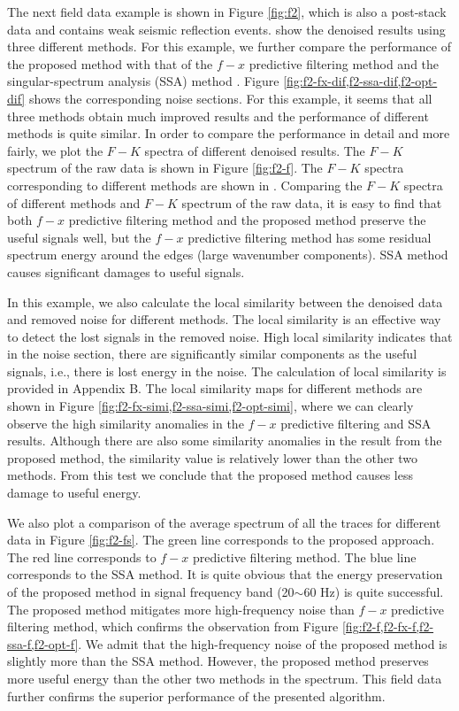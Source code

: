 The next field data example is shown in Figure \ref{fig:f2}, which is also a post-stack data and contains weak seismic reflection events.   show the denoised results using three different methods. For this example, we further compare the performance of the proposed method with that of the $f-x$ predictive filtering method and the singular-spectrum analysis (SSA) method \cite[]{vautard1992singular}. Figure \ref{fig:f2-fx-dif,f2-ssa-dif,f2-opt-dif} shows the corresponding noise sections. For this example, it seems that all three methods obtain much improved results and the performance of different methods is quite similar. In order to compare the performance in detail and more fairly, we plot the $F-K$ spectra of different denoised results. The $F-K$ spectrum of the raw data is shown in Figure \ref{fig:f2-f}. The $F-K$ spectra corresponding to different methods are shown in . Comparing the $F-K$ spectra of different methods and $F-K$ spectrum of the raw data, it is easy to find that both $f-x$ predictive filtering method and the proposed method preserve the useful signals well, but the $f-x$ predictive filtering method has some residual spectrum energy around the edges (large wavenumber components). SSA method causes significant damages to useful signals.

In this example, we also calculate the local similarity between the denoised data and removed noise for different methods. The local similarity is an effective way to detect the lost signals in the removed noise. High local similarity indicates that in the noise section, there are significantly similar components as the useful signals, i.e., there is lost energy in the noise. The calculation of local similarity is provided in Appendix B. The local similarity maps for different methods are shown in Figure \ref{fig:f2-fx-simi,f2-ssa-simi,f2-opt-simi}, where we can clearly observe the high similarity anomalies in the $f-x$ predictive filtering and SSA results. Although there are also some similarity anomalies in the result from the proposed method, the similarity value is relatively lower than the other two methods. From this test we conclude that the proposed method causes less damage to useful energy.

We also plot a comparison of the average spectrum of all the traces for different data in Figure \ref{fig:f2-fs}. The green line corresponds to the proposed approach. The red line corresponds to $f-x$ predictive filtering method.  The blue line corresponds to the SSA method. It is quite obvious that the energy preservation of the proposed method in signal frequency band (20$\sim$60 Hz) is quite successful. The proposed method mitigates more high-frequency noise than $f-x$ predictive filtering method, which confirms the observation from Figure \ref{fig:f2-f,f2-fx-f,f2-ssa-f,f2-opt-f}. We admit that the high-frequency noise of the proposed method is slightly more than the SSA method. However, the proposed method preserves more useful energy than the other two methods in the spectrum. This field data further confirms the superior performance of the presented algorithm.

